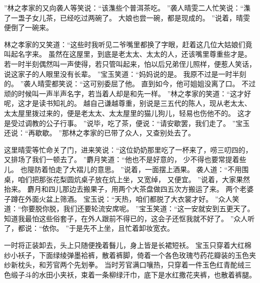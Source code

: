 ”林之孝家的又向袭人等笑说：“该潗些个普洱茶吃。
”袭人晴雯二人忙笑说：“潗了一盄子女儿茶，已经吃过两碗了。
大娘也尝一碗，都是现成的。
”说着，晴雯便倒了一碗来。
\par
林之孝家的又笑道：“这些时我听见二爷嘴里都换了字眼，赶着这几位大姑娘们竟叫起名字来。
虽然在这屋里，到底是老太太、太太的人，还该嘴里尊重些才是。
若一时半刻偶然叫一声使得，若只管叫起来，怕以后兄弟侄儿照样，便惹人笑话，说这家子的人眼里没有长辈。
”宝玉笑道：“妈妈说的是。
我原不过是一时半刻的。
”袭人晴雯都笑说：“这可别委屈了他。
直到如今，他可姐姐没离了口。
不过顽的时候叫一声半声名字，若当着人却是和先一样。
”林之孝家的笑道：“这才好呢，这才是读书知礼的。
越自己谦越尊重，别说是三五代的陈人，现从老太太、太太屋里拨过来的，便是老太太、太太屋里的猫儿狗儿，轻易也伤他不的。
这才是受过调教的公子行事。
”说毕，吃了茶，便说：“请安歇罢，我们走了。
”宝玉还说：“再歇歇。
”那林之孝家的已带了众人，又查别处去了。
\par
这里晴雯等忙命关了门，进来笑说：“这位奶奶那里吃了一杯来了，唠三叨四的，又排场了我们一顿去了。
”麝月笑道：“他也不是好意的，
少不得也要常提着些儿。
也隄防着怕走了大褶儿的意思。
”说着，一面摆上酒果。
袭人道：“不用围桌，咱们把那张花梨圆炕桌子放在炕上坐，又宽绰，
又便宜。
”说着，大家果然抬来。
麝月和四儿那边去搬果子，用两个大茶盘做四五次方搬运了来。
两个老婆子蹲在外面火盆上筛酒。
宝玉说：“天热，咱们都脱了大衣裳才好。
”众人笑道：“你要脱你脱，我们还要轮流安席呢。
”宝玉笑道：“这一安就安到五更天了。
知道我最怕这些俗套子，在外人跟前不得已的，这会子还怄我就不好了。
”众人听了，都说：“依你。
”于是先不上坐，且忙着卸妆宽衣。
\par
一时将正装卸去，头上只随便挽着䰖儿，身上皆是长裙短袄。
宝玉只穿着大红棉纱小袄子，下面绿绫弹墨袷裤，散着裤脚，倚着一个各色玫瑰芍药花瓣装的玉色夹纱新枕头，和芳官两个先划拳。
当时芳官满口嚷热，只穿着一件玉色红青酡绒三色缎子斗的水田小夹袄，束着一条柳绿汗巾，底下是水红撒花夹裤，也散着裤腿。
